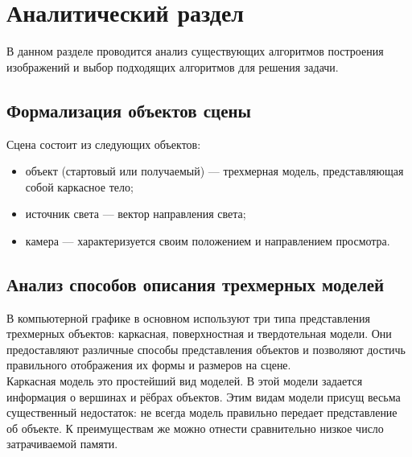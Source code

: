 \chapter{Аналитический раздел}

В данном разделе проводится анализ существующих алгоритмов построения изображений и выбор подходящих алгоритмов для решения задачи.

\section{Формализация объектов сцены}
Сцена состоит из следующих объектов:

\begin{itemize}[label*=---]
	\item объект (стартовый или получаемый) --- трехмерная модель, представляющая собой каркасное тело;
	\item источник света --- вектор направления света;
	\item камера --- характеризуется своим положением и направлением просмотра.
\end{itemize}

\newpage

\section{Анализ способов описания трехмерных моделей}

В компьютерной графике в основном используют три типа представления трехмерных объектов: каркасная, поверхностная и твердотельная модели.
Они предоставляют различные способы представления объектов и позволяют 
достичь правильного отображения их формы и размеров на сцене.\\ %


Каркасная модель это простейший вид моделей. В этой модели задается информация о вершинах и рёбрах объектов. Этим видам модели присущ весьма существенный недостаток: не всегда модель правильно передает представление об объекте. К преимуществам же можно отнести сравнительно низкое число затрачиваемой памяти.\\


